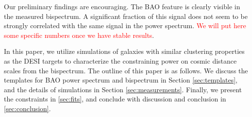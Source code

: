 Our preliminary findings are encouraging. The BAO feature is clearly visible in the measured bispectrum. A significant fraction of this signal does not seem to be strongly correlated with the same signal in the power spectrum. \textcolor{red}{We will put here some specific numbers once we have stable results}.

In this paper, we utilize simulations of galaxies with similar clustering properties as the DESI targets to characterize the constraining power on cosmic distance scales from the bispectrum. The outline of this paper is as follows. We discuss the templates for BAO power spectrum and bispectrum in Section \ref{sec:templates}, and the details of simulations in Section \ref{sec:measurements}. Finally, we present the constraints in \ref{sec:fits}, and conclude with discussion and conclusion in \ref{sec:conclusion}.